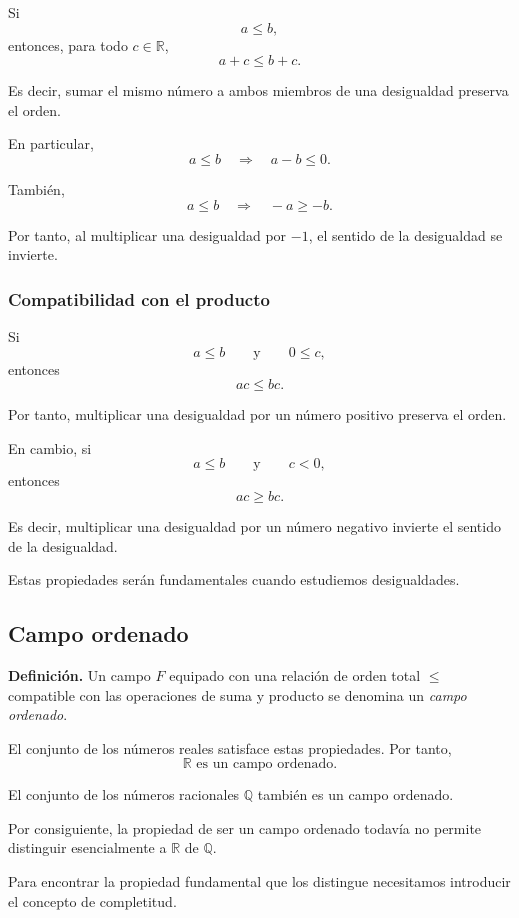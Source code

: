 \documentclass[12pt]{article}
\theoremstyle{plain}
\theoremstyle{definition}
\theoremstyle{remark}
\begin{document}
Si
\[
a\leq b,
\]
entonces, para todo $c\in\mathbb{R}$,
\[
a+c\leq b+c.
\]

Es decir, sumar el mismo número a ambos miembros de una desigualdad
preserva el orden.

En particular,
\[
a\leq b
\quad\Longrightarrow\quad
a-b\leq 0.
\]

También,
\[
a\leq b
\quad\Longrightarrow\quad
-a\geq -b.
\]

Por tanto, al multiplicar una desigualdad por $-1$, el sentido de la
desigualdad se invierte.

\subsubsection*{Compatibilidad con el producto}

Si
\[
a\leq b
\qquad\text{y}\qquad
0\leq c,
\]
entonces
\[
ac\leq bc.
\]

Por tanto, multiplicar una desigualdad por un número positivo preserva
el orden.

En cambio, si
\[
a\leq b
\qquad\text{y}\qquad
c<0,
\]
entonces
\[
ac\geq bc.
\]

Es decir, multiplicar una desigualdad por un número negativo invierte
el sentido de la desigualdad.

Estas propiedades serán fundamentales cuando estudiemos desigualdades.

\subsection{Campo ordenado}

\textbf{Definición.}
Un campo $F$ equipado con una relación de orden total $\leq$ compatible
con las operaciones de suma y producto se denomina un
\emph{campo ordenado}.

El conjunto de los números reales satisface estas propiedades. Por tanto,
\[
\boxed{\mathbb{R}\text{ es un campo ordenado}.}
\]

El conjunto de los números racionales $\mathbb{Q}$ también es un campo
ordenado.

Por consiguiente, la propiedad de ser un campo ordenado todavía no permite
distinguir esencialmente a $\mathbb{R}$ de $\mathbb{Q}$.

Para encontrar la propiedad fundamental que los distingue necesitamos
introducir el concepto de completitud.
\end{document}
